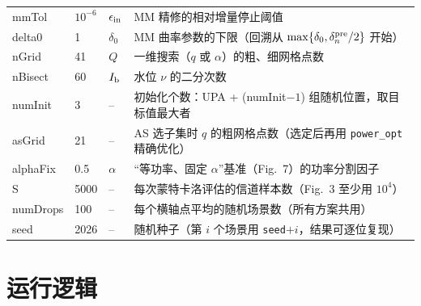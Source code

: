 \documentclass[11pt,a4paper]{ctexart}
\newcommand{\code}[1]{\texttt{#1}}
\begin{document}
\begin{longtable}{>{\ttfamily}p{2.5cm}p{1.6cm}p{2.0cm}p{9.3cm}}
mmTol & $10^{-6}$ & $\epsilon_{\rm in}$ & MM 精修的相对增量停止阈值 \\
delta0 & 1 & $\delta_0$ & MM 曲率参数的下限（回溯从 $\max\{\delta_0,\delta_n^{\rm pre}/2\}$ 开始）\\
nGrid & 41 & $Q$ & 一维搜索（$q$ 或 $\alpha$）的粗、细网格点数 \\
nBisect & 60 & $I_{\rm b}$ & 水位 $\nu$ 的二分次数 \\
numInit & 3 & -- & 初始化个数：UPA + (numInit$-1$) 组随机位置，取目标值最大者 \\
asGrid & 21 & -- & AS 选子集时 $q$ 的粗网格点数（选定后再用 \code{power\_opt} 精确优化）\\
alphaFix & 0.5 & $\alpha$ & “等功率、固定 $\alpha$”基准（Fig.~7）的功率分割因子 \\ \midrule
S & 5000 & -- & 每次蒙特卡洛评估的信道样本数（Fig.~3 至少用 $10^4$）\\
numDrops & 100 & -- & 每个横轴点平均的随机场景数（所有方案共用）\\
seed & 2026 & -- & 随机种子（第 $i$ 个场景用 \code{seed}$+i$，结果可逐位复现）\\
\bottomrule
\end{longtable}

\section{运行逻辑}
\end{document}
